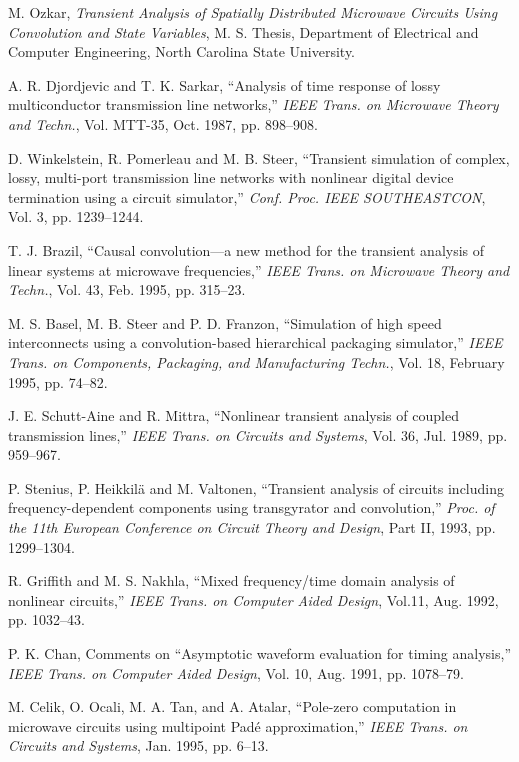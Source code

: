 \begin{thebibliography}{99}
 M. Ozkar, \emph{Transient Analysis of Spatially Distributed
Microwave Circuits Using Convolution and State Variables},
M. S. Thesis, Department of Electrical and Computer Engineering,
North Carolina State University.

 A. R. Djordjevic and T. K. Sarkar, ``Analysis of time
response of lossy multiconductor transmission line networks,''
\emph{IEEE Trans. on Microwave Theory and Techn.}, Vol. MTT-35,
Oct. 1987, pp. 898--908.

 D. Winkelstein, R. Pomerleau and M. B. Steer, ``Transient
simulation of complex, lossy, multi-port transmission line networks
with nonlinear digital device termination using a circuit simulator,''
\emph{Conf. Proc. IEEE SOUTHEASTCON}, Vol. 3, pp. 1239--1244.

 T. J. Brazil, ``Causal convolution---a new method for
the transient analysis of linear systems at microwave frequencies,''
\emph{IEEE Trans. on Microwave Theory and Techn.}, Vol. 43, Feb. 1995,
pp. 315--23.

 M. S. Basel, M. B. Steer and P. D. Franzon,
``Simulation of high speed interconnects using a convolution-based
hierarchical packaging simulator,'' \emph{IEEE Trans. on Components,
Packaging, and Manufacturing Techn.}, Vol. 18, February 1995,
pp. 74--82.

 J. E. Schutt-Aine and R. Mittra, ``Nonlinear transient
analysis of coupled transmission lines,'' \emph{IEEE Trans. on Circuits
and Systems}, Vol. 36, Jul. 1989, pp. 959--967.

 P. Stenius, P. Heikkil\"a and M. Valtonen,
``Transient analysis of circuits including frequency-dependent
components using transgyrator and convolution,''
\emph{Proc. of the 11th European Conference on Circuit Theory and
Design}, Part II, 1993, pp. 1299--1304.

 R. Griffith and M. S. Nakhla, ``Mixed frequency/time
domain analysis of nonlinear circuits,'' \emph{IEEE Trans. on Computer
Aided Design}, Vol.11, Aug. 1992, pp. 1032--43.

 P. K. Chan, Comments on ``Asymptotic waveform
evaluation for timing analysis,'' \emph{IEEE Trans. on Computer Aided
Design}, Vol. 10, Aug. 1991, pp. 1078--79.

 M. Celik, O. Ocali, M. A. Tan, and A. Atalar,
``Pole-zero computation in microwave circuits using multipoint Pad\'e
approximation,'' \emph{IEEE Trans. on Circuits and Systems},
Jan. 1995, pp. 6--13.


\end{thebibliography}
